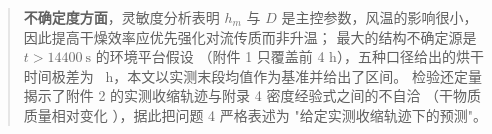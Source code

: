 \begin{abstract}
\textbf{不确定度方面}，灵敏度分析表明 $h_m$ 与 $D$ 是主控参数，风温的影响很小，
因此提高干燥效率应优先强化对流传质而非升温；
最大的结构不确定源是 $t>14400\ \mathrm{s}$ 的环境平台假设
（附件 1 只覆盖前 4 h），五种口径给出的烘干时间极差为
\ h，本文以实测末段均值作为基准并给出了区间。
检验还定量揭示了附件 2 的实测收缩轨迹与附录 4 密度经验式之间的不自洽
（干物质质量相对变化 ），据此把问题 4 严格表述为
"给定实测收缩轨迹下的预测"。

\end{abstract}
